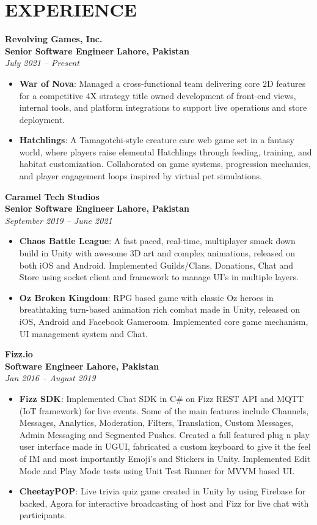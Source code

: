 \documentclass[11pt]{article}
\begin{document}
\section*{EXPERIENCE}
\textbf{Revolving Games, Inc.} \\
\textbf{Senior Software Engineer} \hfill \textbf{Lahore, Pakistan} \\
\textit{July 2021 -- Present}
\begin{itemize}
	\item \textbf{War of Nova}: Managed a cross-functional team delivering core 2D features for a competitive 4X strategy title owned development of front-end views, internal tools, and platform integrations to support live operations and store deployment.
	\item \textbf{Hatchlings}: A Tamagotchi-style creature care web game set in a fantasy world, where players raise elemental Hatchlings through feeding, training, and habitat customization. Collaborated on game systems, progression mechanics, and player engagement loops inspired by virtual pet simulations.
\end{itemize}
\textbf{Caramel Tech Studios} \\
\textbf{Senior Software Engineer} \hfill \textbf{Lahore, Pakistan} \\
\textit{September 2019 -- June 2021}
\begin{itemize}
	\item \textbf{Chaos Battle League}: A fast paced, real-time, multiplayer smack down build in Unity with awesome 3D art and complex animations, released on both iOS and Android. Implemented Guilds/Clans, Donations, Chat and Store using socket client and framework to manage UI’s in multiple layers. 
	\item \textbf{Oz Broken Kingdom}: RPG based game with classic Oz heroes in breathtaking turn-based animation rich combat made in Unity, released on iOS, Android and Facebook Gameroom. Implemented core game mechanism, UI management system and Chat.
\end{itemize}
\textbf{Fizz.io} \\
\textbf{Software Engineer} \hfill \textbf{Lahore, Pakistan} \\
\textit{Jan 2016 -- August 2019}
\begin{itemize}
	\item \textbf{Fizz SDK}: Implemented Chat SDK in C\# on Fizz REST API and MQTT (IoT framework) for live events. Some of the main features include Channels, Messages, Analytics, Moderation, Filters, Translation, Custom Messages, Admin Messaging and Segmented Pushes. Created a full featured plug n play user interface made in UGUI, fabricated a custom keyboard to give it the feel of IM and most importantly Emoji’s and Stickers in Unity. Implemented Edit Mode and Play Mode tests using Unit Test Runner for MVVM based UI.
	\item \textbf{CheetayPOP}: Live trivia quiz game created in Unity by using Firebase for backed, Agora for interactive broadcasting of host and Fizz for live chat with participants.
\end{itemize}
\end{document}
